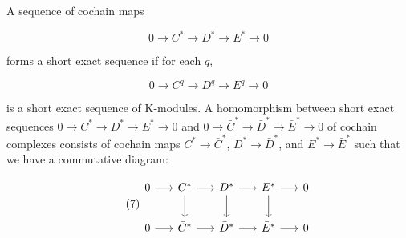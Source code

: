 \begin{definition}
A sequence of cochain maps

\begin{equation}
\tag{5}\label{eq:5.16:5}
0\longrightarrow C^{*}\longrightarrow D^{*}\longrightarrow E^{*}\longrightarrow0
\end{equation}

forms a short exact sequence if for each $q$,

\begin{equation}
\tag{6}\label{eq:5.16:6}
0\longrightarrow C^{q}\longrightarrow D^{q}\longrightarrow E^{q}\longrightarrow0
\end{equation}

is a short exact sequence of K-modules. A homomorphism between short exact sequences $0 \to C^{*} \to D^{*} \to E^{*} \to 0$ and $0 \to \bar{C}^{*} \to \bar{D}^{*} \to \bar{E}^{*} \to 0$ of cochain complexes consists of cochain maps $C^{*} \to \bar{C}^{*}$, $D^{*} \to \bar{D}^{*}$, and $E^{*} \to \bar{E}^{*}$ such that we have a commutative diagram:

\begin{equation}
\tag{7}\label{eq:5.16:7}
\begin{tikzcd}[ampersand replacement=\&, column sep=1.6em,row sep=2em]
0 \arrow[r] \& C^* \arrow[r] \arrow[d] \& D^* \arrow[r] \arrow[d] \& E^* \arrow[r] \arrow[d] \& 0 \\
0 \arrow[r] \& \bar C^* \arrow[r] \& \bar D^* \arrow[r] \& \bar E^* \arrow[r] \& 0
\end{tikzcd}
\end{equation}

\end{definition}

